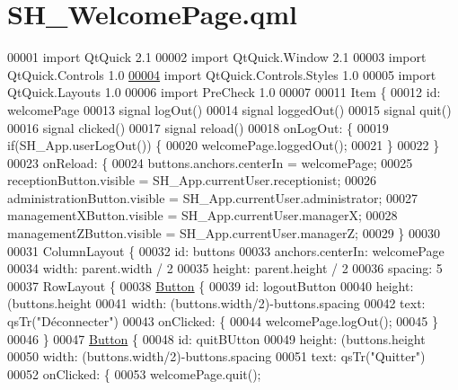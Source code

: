 \hypertarget{SH__WelcomePage_8qml}{\section{S\-H\-\_\-\-Welcome\-Page.\-qml}
\label{SH__WelcomePage_8qml}
}

\begin{DoxyCode}
00001 \textcolor{keyword}{import} QtQuick 2.1
00002 import QtQuick.Window 2.1
00003 import QtQuick.Controls 1.0
\hypertarget{SH__WelcomePage_8qml_source_l00004}{}\hyperlink{classSH__WelcomePage}{00004} import QtQuick.Controls.Styles 1.0
00005 import QtQuick.Layouts 1.0
00006 import PreCheck 1.0
00007 
00011 Item \{
00012     \textcolor{keywordtype}{id}: welcomePage
00013     signal logOut()
00014     signal loggedOut()
00015     signal quit()
00016     signal clicked()
00017     signal reload()
00018     onLogOut: \{
00019         \textcolor{keywordflow}{if}(SH\_App.userLogOut()) \{
00020             welcomePage.loggedOut();
00021         \}
00022     \}
00023     onReload: \{
00024         buttons.anchors.centerIn = welcomePage;
00025         receptionButton.visible = SH\_App.currentUser.receptionist;
00026         administrationButton.visible = SH\_App.currentUser.administrator;
00027         managementXButton.visible = SH\_App.currentUser.managerX;
00028         managementZButton.visible = SH\_App.currentUser.managerZ;
00029     \}
00030 
00031     ColumnLayout \{
00032         \textcolor{keywordtype}{id}: buttons
00033         anchors.centerIn: welcomePage
00034         width: parent.width / 2
00035         height: parent.height / 2
00036         spacing: 5
00037         RowLayout \{
00038             \hyperlink{classButton}{Button} \{
00039                 \textcolor{keywordtype}{id}: logoutButton
00040                 height: (buttons.height%
00041                 width: (buttons.width/2)-buttons.spacing
00042                 text: qsTr(\textcolor{stringliteral}{"Déconnecter"})
00043                 onClicked: \{
00044                     welcomePage.logOut();
00045                 \}
00046             \}
00047             \hyperlink{classButton}{Button} \{
00048                 \textcolor{keywordtype}{id}: quitBUtton
00049                 height: (buttons.height%
00050                 width: (buttons.width/2)-buttons.spacing
00051                 text: qsTr(\textcolor{stringliteral}{"Quitter"})
00052                 onClicked: \{
00053                     welcomePage.quit();

\end{DoxyCode}
